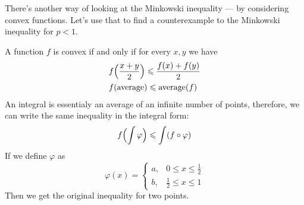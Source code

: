 \begin{remark}
    There's another way of looking at the Minkowski inequality --- by considering convex functions.
    Let's use that to find a counterexample to the Minkowski inequality for $p < 1$.
    \begin{center}   
    \end{center}
    A function $f$ is convex if and only if for every $x, y$ we have
    \begin{align*}
        &f\Bigl(\frac{x+y}{2}\Bigr) \le \frac{f(x) + f(y)}{2}
        \\&
        f(\text{average}) \le \operatorname{average}(f)
    \end{align*}
    An integral is essentialy an average of an infinite number of points, therefore,
    we can write the same inequality in the integral form:
    \[ f\Bigl(\int \varphi\Bigr) \le \int (f \circ \varphi) \]
    If we define $\varphi$ as 
    \[
        \varphi(x) = \begin{cases}
            a, & 0 \le x \le \frac{1}{2}\\
            b, & \frac{1}{2} \le x \le 1
        \end{cases}
    \]
    Then we get the original inequality for two points.


\end{remark}
